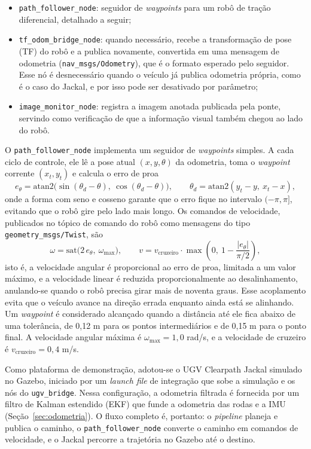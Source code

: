 \documentclass[
    12pt,
    openright,
    oneside,
    a4paper,
    english,
    brazil
]{abntex2}
\begin{document}
\begin{itemize}
    \item \texttt{path\_\allowbreak{}follower\_\allowbreak{}node}: seguidor de \textit{waypoints} para um robô de tração diferencial, detalhado a seguir;
    \item \texttt{tf\_\allowbreak{}odom\_\allowbreak{}bridge\_\allowbreak{}node}: quando necessário, recebe a transformação de pose (TF) do robô e a publica novamente, convertida em uma mensagem de odometria (\texttt{nav\_\allowbreak{}msgs/\allowbreak{}Odometry}), que é o formato esperado pelo seguidor. Esse nó é desnecessário quando o veículo já publica odometria própria, como é o caso do Jackal, e por isso pode ser desativado por parâmetro;
    \item \texttt{image\_\allowbreak{}monitor\_\allowbreak{}node}: registra a imagem anotada publicada pela ponte, servindo como verificação de que a informação visual também chegou ao lado do robô.
\end{itemize}

O \texttt{path\_\allowbreak{}follower\_\allowbreak{}node} implementa um seguidor de \textit{waypoints} simples. A cada ciclo de controle, ele lê a pose atual $(x, y, \theta)$ da odometria, toma o \textit{waypoint} corrente $(x_t, y_t)$ e calcula o erro de proa
\[
e_\theta = \mathrm{atan2}\big(\sin(\theta_d - \theta),\ \cos(\theta_d - \theta)\big),
\qquad
\theta_d = \mathrm{atan2}(y_t - y,\ x_t - x),
\]
onde a forma com seno e cosseno garante que o erro fique no intervalo $(-\pi, \pi]$, evitando que o robô gire pelo lado mais longo. Os comandos de velocidade, publicados no tópico de comando do robô como mensagens do tipo \texttt{geometry\_\allowbreak{}msgs/\allowbreak{}Twist}, são
\[
\omega = \mathrm{sat}\big(2\,e_\theta,\ \omega_{\max}\big),
\qquad
v = v_{\text{cruzeiro}} \cdot \max\left(0,\ 1 - \frac{|e_\theta|}{\pi/2}\right),
\]
isto é, a velocidade angular é proporcional ao erro de proa, limitada a um valor máximo, e a velocidade linear é reduzida proporcionalmente ao desalinhamento, anulando-se quando o robô precisa girar mais de noventa graus. Esse acoplamento evita que o veículo avance na direção errada enquanto ainda está se alinhando. Um \textit{waypoint} é considerado alcançado quando a distância até ele fica abaixo de uma tolerância, de 0,12 m para os pontos intermediários e de 0,15 m para o ponto final. A velocidade angular máxima é $\omega_{\max} = 1{,}0$ rad/s, e a velocidade de cruzeiro é $v_{\text{cruzeiro}} = 0{,}4$ m/s.

Como plataforma de demonstração, adotou-se o UGV Clearpath Jackal simulado no Gazebo, iniciado por um \textit{launch file} de integração que sobe a simulação e os nós do \texttt{ugv\_\allowbreak{}bridge}. Nessa configuração, a odometria filtrada é fornecida por um filtro de Kalman estendido (EKF) que funde a odometria das rodas e a IMU (Seção~\ref{sec:odometria}). O fluxo completo é, portanto: o \textit{pipeline} planeja e publica o caminho, o \texttt{path\_\allowbreak{}follower\_\allowbreak{}node} converte o caminho em comandos de velocidade, e o Jackal percorre a trajetória no Gazebo até o destino.
\end{document}
